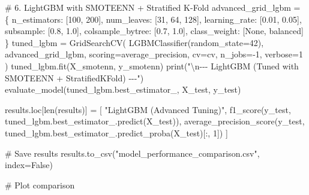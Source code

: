 \documentclass[
  letterpaper,
  DIV=11,
  numbers=noendperiod]{scrartcl}
\newenvironment{Shaded}{\begin{snugshade}}{\end{snugshade}}
\newcommand{\BuiltInTok}[1]{\textcolor[rgb]{0.00,0.23,0.31}{#1}}
\newcommand{\CharTok}[1]{\textcolor[rgb]{0.13,0.47,0.30}{#1}}
\newcommand{\CommentTok}[1]{\textcolor[rgb]{0.37,0.37,0.37}{#1}}
\newcommand{\DecValTok}[1]{\textcolor[rgb]{0.68,0.00,0.00}{#1}}
\newcommand{\FloatTok}[1]{\textcolor[rgb]{0.68,0.00,0.00}{#1}}
\newcommand{\NormalTok}[1]{\textcolor[rgb]{0.00,0.23,0.31}{#1}}
\newcommand{\OperatorTok}[1]{\textcolor[rgb]{0.37,0.37,0.37}{#1}}
\newcommand{\StringTok}[1]{\textcolor[rgb]{0.13,0.47,0.30}{#1}}
\newcommand{\VariableTok}[1]{\textcolor[rgb]{0.07,0.07,0.07}{#1}}
\begin{document}
\begin{Shaded}
\begin{Highlighting}[]
    \CommentTok{\# 6. LightGBM with SMOTEENN + Stratified K{-}Fold}
\NormalTok{    advanced\_grid\_lgbm }\OperatorTok{=}\NormalTok{ \{}
        \StringTok{\textquotesingle{}n\_estimators\textquotesingle{}}\NormalTok{: [}\DecValTok{100}\NormalTok{, }\DecValTok{200}\NormalTok{],}
        \StringTok{\textquotesingle{}num\_leaves\textquotesingle{}}\NormalTok{: [}\DecValTok{31}\NormalTok{, }\DecValTok{64}\NormalTok{, }\DecValTok{128}\NormalTok{],}
        \StringTok{\textquotesingle{}learning\_rate\textquotesingle{}}\NormalTok{: [}\FloatTok{0.01}\NormalTok{, }\FloatTok{0.05}\NormalTok{],}
        \StringTok{\textquotesingle{}subsample\textquotesingle{}}\NormalTok{: [}\FloatTok{0.8}\NormalTok{, }\FloatTok{1.0}\NormalTok{],}
        \StringTok{\textquotesingle{}colsample\_bytree\textquotesingle{}}\NormalTok{: [}\FloatTok{0.7}\NormalTok{, }\FloatTok{1.0}\NormalTok{],}
        \StringTok{\textquotesingle{}class\_weight\textquotesingle{}}\NormalTok{: [}\VariableTok{None}\NormalTok{, }\StringTok{\textquotesingle{}balanced\textquotesingle{}}\NormalTok{]}
\NormalTok{    \}}
\NormalTok{    tuned\_lgbm }\OperatorTok{=}\NormalTok{ GridSearchCV(}
\NormalTok{        LGBMClassifier(random\_state}\OperatorTok{=}\DecValTok{42}\NormalTok{), advanced\_grid\_lgbm,}
\NormalTok{        scoring}\OperatorTok{=}\StringTok{\textquotesingle{}average\_precision\textquotesingle{}}\NormalTok{, cv}\OperatorTok{=}\NormalTok{cv, n\_jobs}\OperatorTok{={-}}\DecValTok{1}\NormalTok{, verbose}\OperatorTok{=}\DecValTok{1}
\NormalTok{    )}
\NormalTok{    tuned\_lgbm.fit(X\_smotenn, y\_smotenn)}
    \BuiltInTok{print}\NormalTok{(}\StringTok{"}\CharTok{\textbackslash{}n}\StringTok{{-}{-}{-} LightGBM (Tuned with SMOTEENN + StratifiedKFold) {-}{-}{-}"}\NormalTok{)}
\NormalTok{    evaluate\_model(tuned\_lgbm.best\_estimator\_, X\_test, y\_test)}

\NormalTok{    results.loc[}\BuiltInTok{len}\NormalTok{(results)] }\OperatorTok{=}\NormalTok{ [}
        \StringTok{"LightGBM (Advanced Tuning)"}\NormalTok{,}
\NormalTok{        f1\_score(y\_test, tuned\_lgbm.best\_estimator\_.predict(X\_test)),}
\NormalTok{        average\_precision\_score(y\_test, tuned\_lgbm.best\_estimator\_.predict\_proba(X\_test)[:, }\DecValTok{1}\NormalTok{])}
\NormalTok{    ]}

    \CommentTok{\# Save results}
\NormalTok{    results.to\_csv(}\StringTok{"model\_performance\_comparison.csv"}\NormalTok{, index}\OperatorTok{=}\VariableTok{False}\NormalTok{)}

    \CommentTok{\# Plot comparison}
    

\end{Highlighting}
\end{Shaded}
\end{document}
